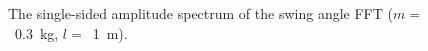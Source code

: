 
\begin{figure}
    \captionsetup[subfigure]{justification=centering}
    \centering
    \caption{ The single-sided amplitude spectrum of the swing angle FFT 
    ($m =$~\SI{0.3}{\kilo\gram}, $l =$~\SI{1}{\meter}).}
    \label{fig:FFT_subfigs}  
\end{figure}
